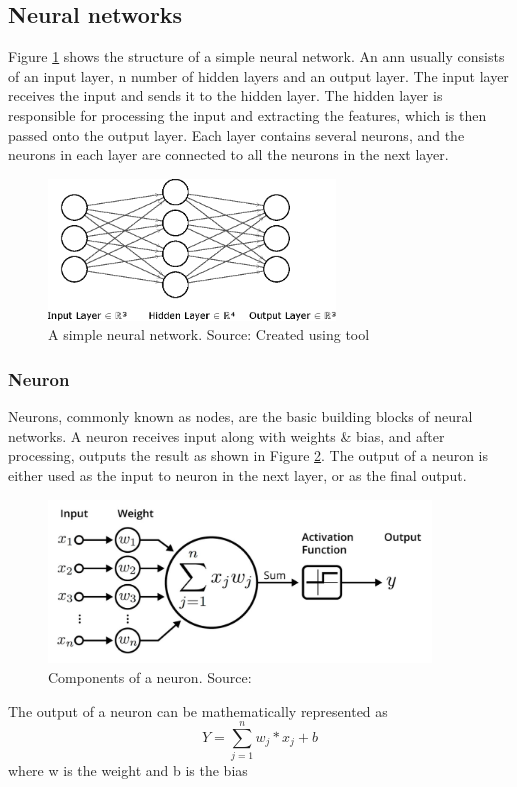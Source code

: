 \subsection{Neural networks}

Figure \ref{fig:snn} shows the structure of a simple neural network. An \gls{ann} usually consists of an input layer, n number of hidden layers and an output layer. The input layer receives the input and sends it to the hidden layer. The hidden layer is responsible for processing the input and extracting the features, which is then passed onto the output layer. Each layer contains several neurons, and the neurons in each layer are connected to all the neurons in the next layer. 
\begin{figure}[H]
\centering
\includegraphics[width=3in]{images/nn.eps}
\caption[A simple neural network]{A simple neural network. Source: Created using tool \citep{nn}}
\label{fig:snn}
\end{figure}
\subsubsection*{Neuron}
Neurons, commonly known as nodes, are the basic building blocks of neural networks. A neuron receives input along with weights \& bias, and after processing, outputs the result as shown in Figure \ref{fig:Components of a neuron}. The output of a neuron is either used as the input to neuron in the next layer, or as the final output. 
\begin{figure}[H]
\centering
\includegraphics[width=4in,scale=1]{images/neuron.jpg}
\caption[Components of a neuron]{Components of a neuron. Source: \citep{neuron}}
\label{fig:Components of a neuron}
\end{figure}	
The output of a neuron can be mathematically represented as 
\begin{equation*}
Y=\sum_{j=1}^{n}w_{j}*x_{j} + b
\end{equation*}
	where w is the weight and b is the bias 	


